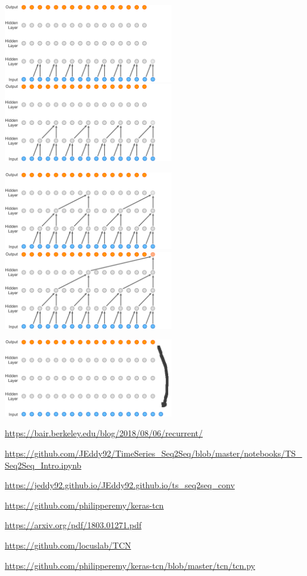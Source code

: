 \documentclass[12pt,fleqn]{article}\usepackage{../../common}
\begin{document}
\vspace{3em}

\includegraphics[width=20em]{wave-104.png}
\includegraphics[width=20em]{wave-119.png}

\vspace{3em}

\includegraphics[width=20em]{wave-134.png}
\includegraphics[width=20em]{wave-149.png}

\vspace{3em}

\includegraphics[width=20em]{wave-179.png}






\url{https://bair.berkeley.edu/blog/2018/08/06/recurrent/}

\url{https://github.com/JEddy92/TimeSeries_Seq2Seq/blob/master/notebooks/TS_Seq2Seq_Intro.ipynb}

\url{https://jeddy92.github.io/JEddy92.github.io/ts_seq2seq_conv}

\url{https://github.com/philipperemy/keras-tcn}

\url{https://arxiv.org/pdf/1803.01271.pdf}

\url{https://github.com/locuslab/TCN}

\url{https://github.com/philipperemy/keras-tcn/blob/master/tcn/tcn.py}
\end{document}
